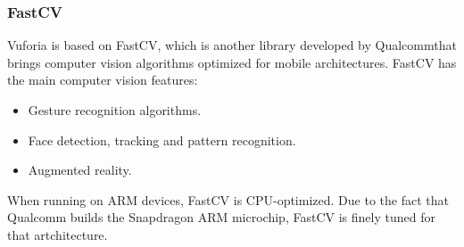 \subsubsection{FastCV}
Vuforia is based on FastCV, which is another library developed by
Qualcomm\textregistered that brings computer vision algorithms optimized for mobile
architectures. FastCV has the main computer vision features\cite{fastcv}:

\begin{itemize}
\item Gesture recognition algorithms.
\item Face detection, tracking and pattern recognition.
\item Augmented reality.
\end{itemize}

When running on ARM devices, FastCV is CPU-optimized. Due to the fact that Qualcomm
builds the Snapdragon ARM microchip, FastCV is finely tuned for that artchitecture. 
